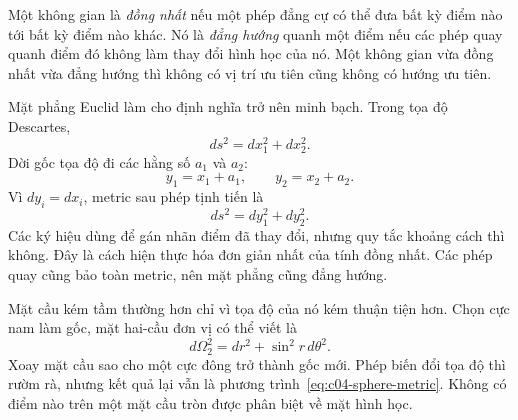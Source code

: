\begin{definition}
Một không gian là \emph{đồng nhất} nếu một phép đẳng cự có thể đưa bất kỳ điểm nào tới bất kỳ điểm nào khác. Nó là \emph{đẳng hướng} quanh một điểm nếu các phép quay quanh điểm đó không làm thay đổi hình học của nó. Một không gian vừa đồng nhất vừa đẳng hướng thì không có vị trí ưu tiên cũng không có hướng ưu tiên.
\end{definition}

Mặt phẳng Euclid làm cho định nghĩa trở nên minh bạch. Trong tọa độ Descartes,
\begin{equation}
ds^2=dx_1^2+dx_2^2.
\label{eq:c04-flat-metric}
\end{equation}
Dời gốc tọa độ đi các hằng số \(a_1\) và \(a_2\):
\begin{equation}
y_1=x_1+a_1,
\qquad
y_2=x_2+a_2.
\label{eq:c04-flat-translation}
\end{equation}
Vì \(dy_i=dx_i\), metric sau phép tịnh tiến là
\begin{equation}
ds^2=dy_1^2+dy_2^2.
\end{equation}
Các ký hiệu dùng để gán nhãn điểm đã thay đổi, nhưng quy tắc khoảng cách thì không. Đây là cách hiện thực hóa đơn giản nhất của tính đồng nhất. Các phép quay cũng bảo toàn metric, nên mặt phẳng cũng đẳng hướng.

Mặt cầu kém tầm thường hơn chỉ vì tọa độ của nó kém thuận tiện hơn. Chọn cực nam làm gốc, mặt hai-cầu đơn vị có thể viết là
\begin{equation}
d\Omega_2^2=dr^2+\sin^2 r\,d\theta^2.
\label{eq:c04-sphere-metric}
\end{equation}
Xoay mặt cầu sao cho một cực đông trở thành gốc mới. Phép biến đổi tọa độ thì rườm rà, nhưng kết quả lại vẫn là phương trình~\eqref{eq:c04-sphere-metric}. Không có điểm nào trên một mặt cầu tròn được phân biệt về mặt hình học.

\begin{classroomqa}
\end{classroomqa}

